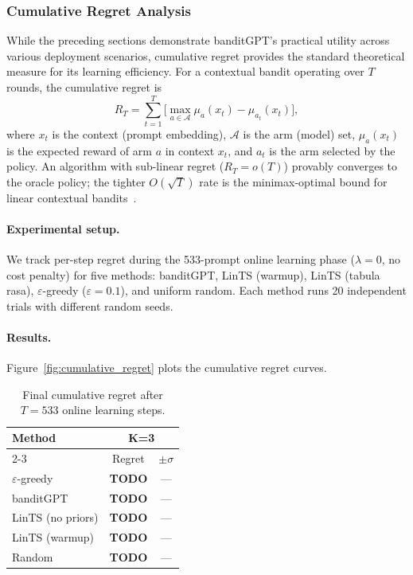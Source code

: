 
\subsubsection{Cumulative Regret Analysis}

While the preceding sections demonstrate banditGPT's practical utility across various deployment scenarios, cumulative regret provides the standard theoretical measure for its learning efficiency. For a contextual bandit operating over $T$ rounds, the
cumulative regret is
\[
  R_T = \sum_{t=1}^{T} \bigl[\max_{a \in \mathcal{A}} \mu_a(x_t) - \mu_{a_t}(x_t)\bigr],
\]
where $x_t$ is the context (prompt embedding), $\mathcal{A}$ is the arm
(model) set, $\mu_a(x_t)$ is the expected reward of arm $a$ in context $x_t$,
and $a_t$ is the arm selected by the policy.  An algorithm with sub-linear
regret ($R_T = o(T)$) provably converges to the oracle policy; the tighter
$O(\sqrt{T})$ rate is the minimax-optimal bound for linear contextual
bandits~\cite{abbasi2011improved}.

\paragraph{Experimental setup.}
We track per-step regret during the 533-prompt online learning phase
($\lambda = 0$, no cost penalty) for five methods:
banditGPT, LinTS (warmup), LinTS (tabula rasa), $\varepsilon$-greedy ($\varepsilon{=}0.1$),
and uniform random.
Each method runs 20 independent trials with different random seeds.

\paragraph{Results.}



Figure~\ref{fig:cumulative_regret} plots the cumulative regret curves.

\begin{table}[htbp]
\centering
\small
\caption{Final cumulative regret after $T{=}533$ online learning steps.}
\label{tab:final_regret}
\begin{tabular}{lcc}
\toprule
\textbf{Method} & \multicolumn{2}{c}{\textbf{K=3}} \\
\cmidrule(lr){2-3}
 & Regret & $\pm\sigma$ \\
\midrule
$\varepsilon$-greedy  & \textbf{TODO} & --- \\
banditGPT             & \textbf{TODO} & --- \\
LinTS (no priors)     & \textbf{TODO} & --- \\
LinTS (warmup)        & \textbf{TODO} & --- \\
Random                & \textbf{TODO} & --- \\
\bottomrule
\end{tabular}
\end{table}

